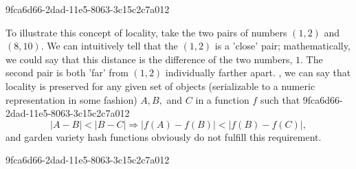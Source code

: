 \documentclass[12pt]{article}
\begin{document}
9fca6d66-2dad-11e5-8063-3c15c2c7a012\par To illustrate this concept of locality, take the two pairs of numbers $(1,2)$ and $(8,10)$. We can intuitively tell that the $(1,2)$ is a 'close' pair; mathematically, we could say that this distance is the difference of the two numbers, $1$. The second pair is both 'far' from $(1,2)$ individually farther apart. , we can say that locality is preserved for any given set of objects (serializable to a numeric representation in some fashion) $A,B,$ and $C$ in a function $f$ such that
9fca6d66-2dad-11e5-8063-3c15c2c7a012\begin{equation}
|A-B| < |B-C| \Rightarrow |f(A)-f(B)| < |f(B) - f(C)|,
\end{equation}
and garden variety hash functions obviously do not fulfill this requirement.

\printbibliography
9fca6d66-2dad-11e5-8063-3c15c2c7a012
\end{document}
